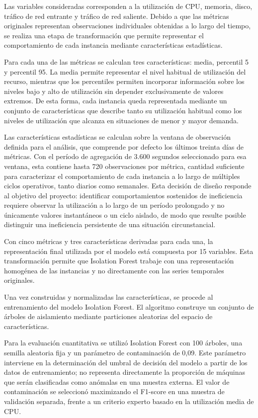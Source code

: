 Las variables consideradas corresponden a la utilización de CPU,
memoria, disco, tráfico de red entrante y tráfico de red saliente.
Debido a que las métricas originales representan observaciones
individuales obtenidas a lo largo del tiempo, se realiza una etapa de
transformación que permite representar el comportamiento de cada
instancia mediante características estadísticas.

Para cada una de las métricas se calculan tres características: media,
percentil 5 y percentil 95. La media permite representar el nivel
habitual de utilización del recurso, mientras que los percentiles
permiten incorporar información sobre los niveles bajo y alto de
utilización sin depender exclusivamente de valores extremos. De esta
forma, cada instancia queda representada mediante un conjunto de
características que describe tanto su utilización habitual como los
niveles de utilización que alcanza en situaciones de menor y mayor
demanda.

Las características estadísticas se calculan sobre la ventana de
observación definida para el análisis, que comprende por defecto los
últimos treinta días de métricas. Con el período de agregación de 3.600
segundos seleccionado para esa ventana, esta contiene hasta 720
observaciones por métrica, cantidad suficiente para caracterizar el
comportamiento de cada instancia a lo largo de múltiples ciclos
operativos, tanto diarios como semanales.
Esta decisión de diseño responde al objetivo del proyecto: identificar
comportamientos sostenidos de ineficiencia requiere observar la
utilización a lo largo de un período prolongado y no únicamente valores
instantáneos o un ciclo aislado, de modo que resulte posible distinguir
una ineficiencia persistente de una situación circunstancial.

Con cinco métricas y tres características derivadas para cada una, la
representación final utilizada por el modelo está compuesta por 15
variables. Esta transformación permite que Isolation Forest trabaje con
una representación homogénea de las instancias y no directamente con las
series temporales originales.

Una vez construidas y normalizadas las características, se procede al
entrenamiento del modelo Isolation Forest. El algoritmo construye un
conjunto de árboles de aislamiento mediante particiones aleatorias del
espacio de características.

Para la evaluación cuantitativa se utilizó Isolation Forest con 100
árboles, una semilla aleatoria fija y un parámetro de contaminación de
0,09. Este parámetro interviene en la determinación del umbral de decisión
del modelo a partir de los datos de entrenamiento; no representa
directamente la proporción de máquinas que serán clasificadas como
anómalas en una muestra externa. El valor de contaminación se seleccionó
maximizando el F1-score en una muestra de validación separada, frente a un
criterio experto basado en la utilización media de CPU.

